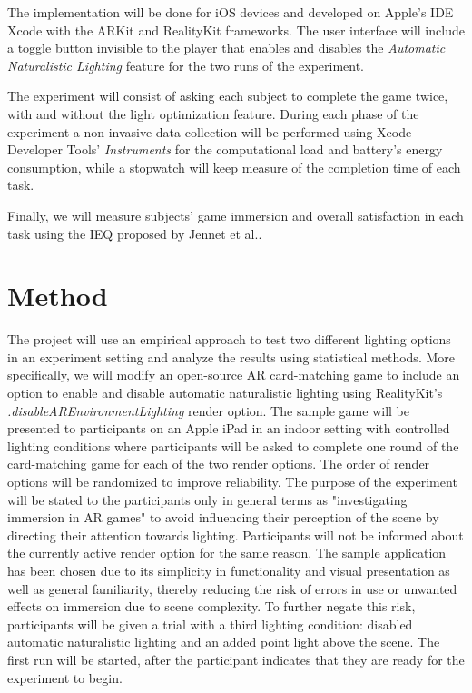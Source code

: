 \documentclass[12pt,twoside,english]{article}
\begin{document}
The implementation will be done for iOS devices and developed on Apple's IDE Xcode with the ARKit and RealityKit frameworks.
The user interface will include a toggle button invisible to the player that enables and disables the \emph{Automatic Naturalistic Lighting} feature for the two runs of the experiment.

The experiment will consist of asking each subject to complete the game twice, with and without the light optimization feature.
During each phase of the experiment a non-invasive data collection will be performed using Xcode Developer Tools' \emph{Instruments} for the computational load and battery's energy consumption, while a stopwatch will keep measure of the completion time of each task.

Finally, we will measure subjects' game immersion and overall satisfaction in each task using the \gls{IEQ} proposed by Jennet et al.\cite{jennett_measuring_2008}.

\section{Method}
\label{sect:method}

The project will use an empirical approach to test two different lighting options in an experiment setting and analyze the results using statistical methods.
More specifically, we will modify an open-source \gls{AR} card-matching game \cite{cobb_maxxfrazerrealitykit-cardflip_2020} to include an option to enable and disable automatic naturalistic lighting using RealityKit's \textit{.disableAREnvironmentLighting} render option.
The sample game will be presented to participants on an Apple iPad in an indoor setting with controlled lighting conditions where participants will be asked to complete one round of the card-matching game for each of the two render options.
The order of render options will be randomized to improve reliability.
The purpose of the experiment will be stated to the participants only in general terms as "investigating immersion in \gls{AR} games" to avoid influencing their perception of the scene by directing their attention towards lighting.
Participants will not be informed about the currently active render option for the same reason.
The sample application has been chosen due to its simplicity in functionality and visual presentation as well as general familiarity, thereby reducing the risk of errors in use or unwanted effects on immersion due to scene complexity.
To further negate this risk, participants will be given a trial with a third lighting condition: disabled automatic naturalistic lighting and an added point light above the scene.
The first run will be started, after the participant indicates that they are ready for the experiment to begin.
\end{document}
